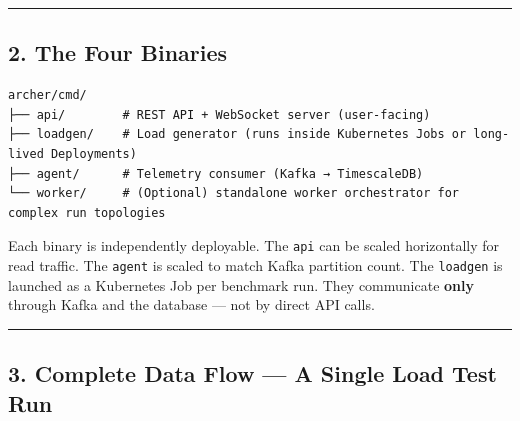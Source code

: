 \documentclass[
]{article}
\begin{document}
\begin{center}\rule{0.5\linewidth}{0.5pt}\end{center}

\hypertarget{the-four-binaries}{%
\subsection{2. The Four Binaries}\label{the-four-binaries}}

\begin{verbatim}
archer/cmd/
├── api/        # REST API + WebSocket server (user-facing)
├── loadgen/    # Load generator (runs inside Kubernetes Jobs or long-lived Deployments)
├── agent/      # Telemetry consumer (Kafka → TimescaleDB)
└── worker/     # (Optional) standalone worker orchestrator for complex run topologies
\end{verbatim}

Each binary is independently deployable. The \texttt{api} can be scaled
horizontally for read traffic. The \texttt{agent} is scaled to match
Kafka partition count. The \texttt{loadgen} is launched as a Kubernetes
Job per benchmark run. They communicate \textbf{only} through Kafka and
the database --- not by direct API calls.

\begin{center}\rule{0.5\linewidth}{0.5pt}\end{center}

\hypertarget{complete-data-flow-a-single-load-test-run}{%
\subsection{3. Complete Data Flow --- A Single Load Test
Run}\label{complete-data-flow-a-single-load-test-run}}
\end{document}
